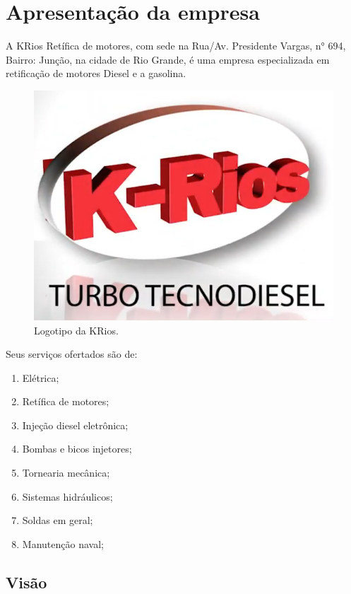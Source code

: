 \chapter{Apresentação da empresa}\label{ch:apresentacao}

A KRios Retífica de motores, com sede na Rua/Av. Presidente Vargas, n° 694, Bairro: Junção, 
na cidade de Rio Grande, é uma empresa especializada em retificação de motores Diesel e a gasolina.

\begin{figure}[H]
\centering
\caption{Logotipo da KRios.}\label{fig:logotipokrios}
\includegraphics[scale = 0.5]{figuras/logotipokrios}
\end{figure}
    
Seus serviços ofertados são de:

\begin{enumerate}
    \item Elétrica;
    \item Retífica de motores;
    \item Injeção diesel eletrônica;
    \item Bombas e bicos injetores;
    \item Tornearia mecânica;
    \item Sistemas hidráulicos;
    \item Soldas em geral;
    \item Manutenção naval;
\end{enumerate}

\section{Visão}\label{sec:visao}

